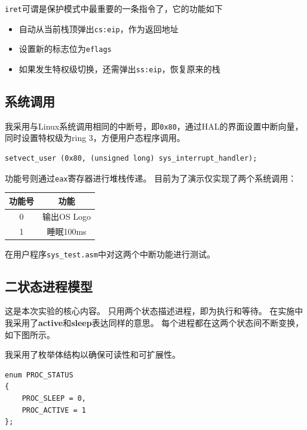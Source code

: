 \documentclass[logo,reportComp]{thesis}
\begin{document}
\verb'iret'可谓是保护模式中最重要的一条指令了，它的功能如下
\begin{itemize}
\item 自动从当前栈顶弹出\verb'cs:eip'，作为返回地址
\item 设置新的标志位为\verb'eflags'
\item 如果发生特权级切换，还需弹出\verb'ss:eip'，恢复原来的栈
\end{itemize}

\subsection{系统调用}
我采用与Linux系统调用相同的中断号，即\verb'0x80'，通过HAL的界面设置中断向量，同时设置特权级为ring 3，方便用户态程序调用。
\begin{lstlisting}
setvect_user (0x80, (unsigned long) sys_interrupt_handler);
\end{lstlisting}

功能号则通过\verb'eax'寄存器进行堆栈传递。
目前为了演示仅实现了两个系统调用：
\begin{center}
\begin{tabular}{|c|c|}\hline
\textbf{功能号} & \textbf{功能}\\\hline
0 & 输出OS Logo\\\hline
1 & 睡眠100ms\\\hline
\end{tabular}
\end{center}

在用户程序\verb'sys_test.asm'中对这两个中断功能进行测试。

\subsection{二状态进程模型}
\label{sub:process}
这是本次实验的核心内容。
只用两个状态描述进程，即为执行和等待。
在实施中我采用了\textbf{active}和\textbf{sleep}表达同样的意思。
每个进程都在这两个状态间不断变换，如下图所示。
\begin{center}
\end{center}

我采用了枚举体结构以确保可读性和可扩展性。
\begin{lstlisting}
enum PROC_STATUS
{
	PROC_SLEEP = 0,
	PROC_ACTIVE = 1
};
\end{lstlisting}
\end{document}
